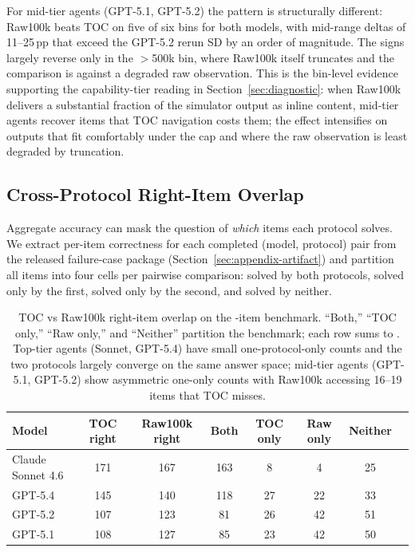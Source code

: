 \documentclass{article}
\begin{document}
For mid-tier agents (GPT-5.1, GPT-5.2) the pattern is structurally different: Raw100k beats TOC on five of six bins for both models, with mid-range deltas of 11--25\,pp that exceed the GPT-5.2 rerun SD by an order of magnitude. The signs largely reverse only in the $>$500k bin, where Raw100k itself truncates and the comparison is against a degraded raw observation. This is the bin-level evidence supporting the capability-tier reading in Section~\ref{sec:diagnostic}: when Raw100k delivers a substantial fraction of the simulator output as inline content, mid-tier agents recover items that TOC navigation costs them; the effect intensifies on outputs that fit comfortably under the cap and where the raw observation is least degraded by truncation.

\subsection{Cross-Protocol Right-Item Overlap}
\label{sec:appendix-cross-protocol-overlap}

Aggregate accuracy can mask the question of \emph{which} items each protocol solves. We extract per-item correctness for each completed (model, protocol) pair from the released failure-case package (Section~\ref{sec:appendix-artifact}) and partition all \BenchN{} items into four cells per pairwise comparison: solved by both protocols, solved only by the first, solved only by the second, and solved by neither.

\begin{table}[h]
\centering
\small
\setlength{\tabcolsep}{6pt}
\begin{tabular}{lccccccc}
\toprule
Model & TOC right & Raw100k right & Both & TOC only & Raw only & Neither \\
\midrule
Claude Sonnet 4.6 & 171 & 167 & 163 & 8 & 4 & 25 \\
GPT-5.4 & 145 & 140 & 118 & 27 & 22 & 33 \\
GPT-5.2 & 107 & 123 & 81 & 26 & 42 & 51 \\
GPT-5.1 & 108 & 127 & 85 & 23 & 42 & 50 \\
\bottomrule
\end{tabular}
\caption{TOC vs Raw100k right-item overlap on the \BenchN{}-item benchmark. ``Both,'' ``TOC only,'' ``Raw only,'' and ``Neither'' partition the benchmark; each row sums to \BenchN. Top-tier agents (Sonnet, GPT-5.4) have small one-protocol-only counts and the two protocols largely converge on the same answer space; mid-tier agents (GPT-5.1, GPT-5.2) show asymmetric one-only counts with Raw100k accessing 16--19 items that TOC misses.}
\label{tab:appendix-overlap-toc-raw100}
\end{table}
\end{document}
